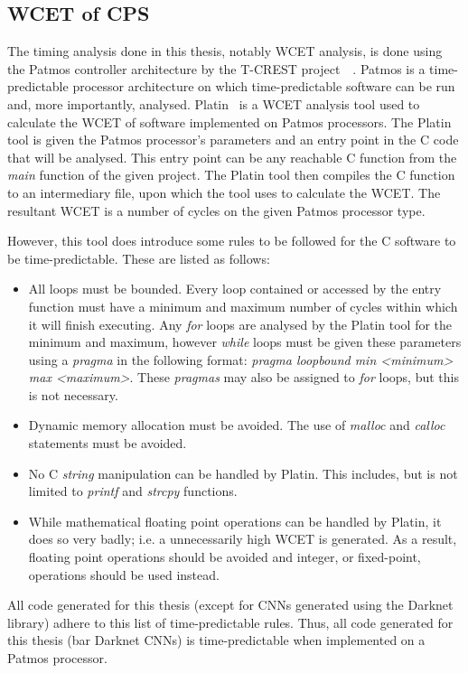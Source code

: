 \subsection{\acf{WCET} of \acf{CPS}}
The timing analysis done in this thesis, notably \acf{WCET} analysis, is done using the Patmos controller architecture by the T-CREST project~\cite{patmos}~\cite{patmos:ppes2011}.
Patmos is a time-predictable processor architecture on which time-predictable software can be run and, more importantly, analysed.
Platin~\cite{compiler:platin:kps15} is a \acf{WCET} analysis tool used to calculate the \ac{WCET} of software implemented on Patmos processors.
The Platin tool is given the Patmos processor's parameters and an entry point in the C code that will be analysed.
This entry point can be any reachable C function from the \textit{main} function of the given project.
The Platin tool then compiles the C function to an intermediary file, upon which the tool uses to calculate the \ac{WCET}.
The resultant \ac{WCET} is a number of cycles on the given Patmos processor type.

However, this tool does introduce some rules to be followed for the C software to be time-predictable.
These are listed as follows:
\begin{itemize}
	\item All loops must be bounded. Every loop contained or accessed by the entry function must have a minimum and maximum number of cycles within which it will finish executing. Any \textit{for} loops are analysed by the Platin tool for the minimum and maximum, however \textit{while} loops must be given these parameters using a \textit{pragma} in the following format: \textit{pragma loopbound min <minimum> max <maximum>}. These \textit{pragmas} may also be assigned to \textit{for} loops, but this is not necessary.
	\item Dynamic memory allocation must be avoided. The use of \textit{malloc} and \textit{calloc} statements must be avoided.
	\item No C \textit{string} manipulation can be handled by Platin. This includes, but is not limited to \textit{printf} and \textit{strcpy} functions.
	\item While mathematical floating point operations can be handled by Platin, it does so very badly; i.e. a unnecessarily high \ac{WCET} is generated. As a result, floating point operations should be avoided and integer, or fixed-point, operations should be used instead.
\end{itemize}
All code generated for this thesis (except for \acp{CNN} generated using the Darknet library) adhere to this list of time-predictable rules.
Thus, all code generated for this thesis (bar Darknet \acp{CNN}) is time-predictable when implemented on a Patmos processor.

